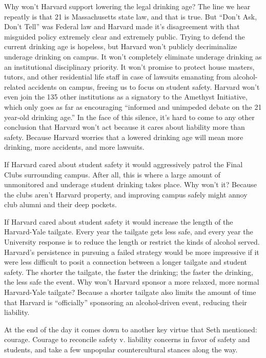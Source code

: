 Why won't Harvard support lowering the legal drinking age? The line we hear
repeatly is that 21 is Massachusetts state law, and that is true. But ``Don't
Ask, Don't Tell'' was Federal law and Harvard made it's disagreement with
that misguided policy extremely clear and extremely public. Trying to defend
the current drinking age is hopeless, but Harvard won't publicly
decriminalize underage drinking on campus. It won't completely eliminate
underage drinking as an institutional disciplinary priority. It won't promise
to protect house masters, tutors, and other residential life staff in case of
lawsuits emanating from alcohol-related accidents on campus, freeing us to
focus on student safety. Harvard won't even join the 135 other institutions
as a signatory to the Amethyst Initiative, which only goes as far as
encouraging ``informed and unimpeded debate on the 21 year-old drinking
age.'' In the face of this silence, it's hard to come to any other conclusion
that Harvard won't act because it cares about liability more than safety.
Because Harvard worries that a lowered drinking age will mean more drinking,
more accidents, and more lawsuits.

If Harvard cared about student safety it would aggressively patrol the Final
Clubs surrounding campus. After all, this is where a large amount of
unmonitored and underage student drinking takes place. Why won't it? Because
the clubs aren't Harvard property, and improving campus safely might annoy
club alumni and their deep pockets.

If Harvard cared about student safety it would increase the length of the
Harvard-Yale tailgate. Every year the tailgate gets less safe, and every year
the University response is to reduce the length or restrict the kinds of
alcohol served. Harvard's persistence in pursuing a failed strategy would be
more impressive if it were less difficult to posit a connection between a
longer tailgate and student safety. The shorter the tailgate, the faster the
drinking; the faster the drinking, the less safe the event. Why won't Harvard
sponsor a more relaxed, more normal Harvard-Yale tailgate? Because a shorter
tailgate also limits the amount of time that Harvard is ``officially''
sponsoring an alcohol-driven event, reducing their liability.

At the end of the day it comes down to another key virtue that Seth
mentioned: courage. Courage to reconcile safety v. liability concerns in
favor of safety and students, and take a few unpopular countercultural
stances along the way.
